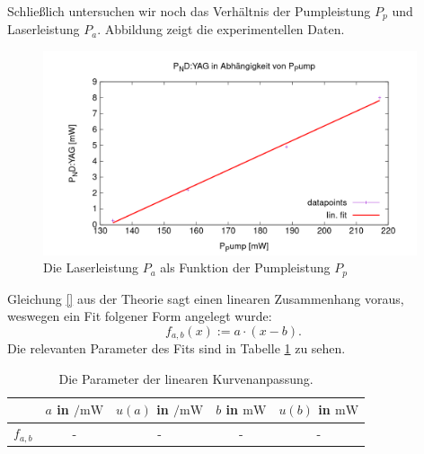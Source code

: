 \documentclass[../../../main.tex]{subfiles}
\begin{document}
    Schließlich untersuchen wir noch das Verhältnis der Pumpleistung $P_p$ und Laserleistung $P_a$. Abbildung zeigt die experimentellen Daten.

    \begin{figure}[H]
        \centering
        \includegraphics[width=11cm]{../../Bilddateien/5/P(NDYAG)overP(Pump).png}
        \caption{Die Laserleistung $P_a$ als Funktion der Pumpleistung $P_p$}
        \label{fig:PumpLaserLeistung}
    \end{figure}

    Gleichung \eqref{} aus der Theorie sagt einen linearen Zusammenhang voraus, weswegen ein Fit folgener Form angelegt wurde:
    \[
        f_{a,b}(x) := a\cdot (x - b).      
    \]
    Die relevanten Parameter des Fits sind in Tabelle \ref{tab:PumpLaserLeistungFitParameter} zu sehen.

    \begin{table}[H]
        \centering
        \begin{tabular}{c|cc |cc}
            \hline
            & $a$ in $\si{\per\m\W}$ & $u(a)$ in $\si{\per\m\W}$ & $b$ in $\si{\m\W}$ & $u(b)$ in $\si{\m\W}$\\
            \hline\hline
            $f_{a, b}$ & - & - & - & -
        \end{tabular}
        \caption{Die Parameter der linearen Kurvenanpassung.}
        \label{tab:PumpLaserLeistungFitParameter}
    \end{table}
\end{document}
